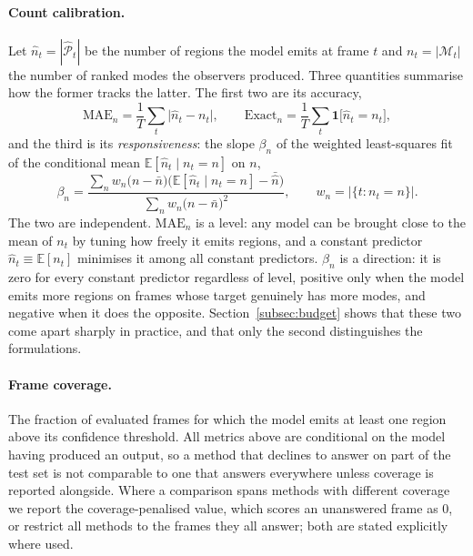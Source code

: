 \documentclass[preprint,12pt]{elsarticle}
\begin{document}
\paragraph{Count calibration.}
Let $\hat{n}_t = |\hat{\mathcal{P}}_t|$ be the number of regions the model
emits at frame $t$ and $n_t = |\mathcal{M}_t|$ the number of ranked modes the
observers produced. Three quantities summarise how the former tracks the
latter. The first two are its accuracy,
\begin{equation}
  \text{MAE}_n = \frac{1}{T}\sum_t \bigl|\hat{n}_t - n_t\bigr|,
  \qquad
  \text{Exact}_n = \frac{1}{T}\sum_t \mathbf{1}\bigl[\hat{n}_t = n_t\bigr],
  \label{eq:count_err}
\end{equation}
and the third is its \emph{responsiveness}: the slope $\beta_n$ of the weighted
least-squares fit of the conditional mean $\mathbb{E}[\hat{n}_t \mid n_t = n]$
on $n$,
\begin{equation}
  \beta_n = \frac{\sum_{n} w_n \bigl(n - \bar{n}\bigr)
                  \bigl(\mathbb{E}[\hat{n}_t \mid n_t = n] - \bar{\hat{n}}\bigr)}
                 {\sum_{n} w_n \bigl(n - \bar{n}\bigr)^2},
  \qquad w_n = \bigl|\{t : n_t = n\}\bigr|.
  \label{eq:count_slope}
\end{equation}
The two are independent. $\text{MAE}_n$ is a level: any model can be brought
close to the mean of $n_t$ by tuning how freely it emits regions, and a
constant predictor $\hat{n}_t \equiv \mathbb{E}[n_t]$ minimises it among all
constant predictors. $\beta_n$ is a direction: it is zero for every constant
predictor regardless of level, positive only when the model emits more regions
on frames whose target genuinely has more modes, and negative when it does the
opposite. Section~\ref{subsec:budget} shows that these two come apart sharply
in practice, and that only the second distinguishes the formulations.

\paragraph{Frame coverage.}
The fraction of evaluated frames for which the model emits at least one region
above its confidence threshold. All metrics above are conditional on the model
having produced an output, so a method that declines to answer on part of the
test set is not comparable to one that answers everywhere unless coverage is
reported alongside. Where a comparison spans methods with different coverage we
report the coverage-penalised value, which scores an unanswered frame as $0$,
or restrict all methods to the frames they all answer; both are stated
explicitly where used.
\end{document}
